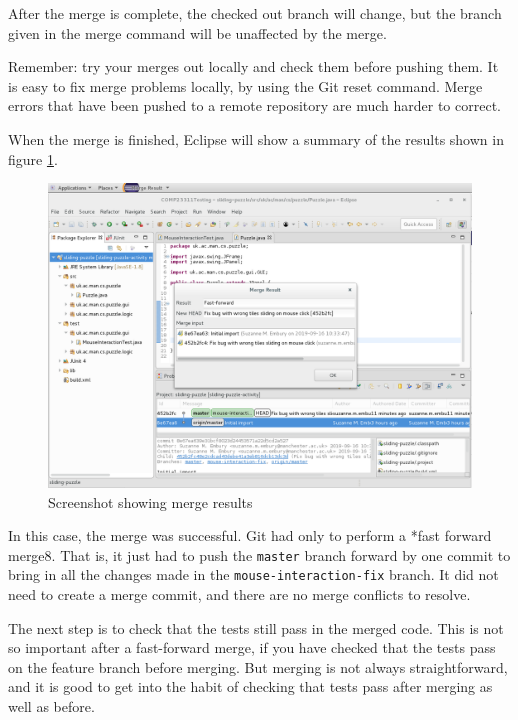 \documentclass[
]{book}
\begin{document}
After the merge is complete, the checked out branch will change, but the branch given in the merge command will be unaffected by the merge.

Remember: try your merges out locally and check them before pushing them. It is easy to fix merge problems locally, by using the Git reset command. Merge errors that have been pushed to a remote repository are much harder to correct.

When the merge is finished, Eclipse will show a summary of the results shown in figure \ref{fig:mergeResultShowingSuccessFastForward-fig}.

\begin{figure}

{\centering \includegraphics[width=1\linewidth]{images/mergeResultShowingSuccessFastForward} 

}

\caption{Screenshot showing merge results}\label{fig:mergeResultShowingSuccessFastForward-fig}
\end{figure}

In this case, the merge was successful. Git had only to perform a *fast forward merge8. That is, it just had to push the \texttt{master} branch forward by one commit to bring in all the changes made in the \texttt{mouse-interaction-fix} branch. It did not need to create a merge commit, and there are no merge conflicts to resolve.

The next step is to check that the tests still pass in the merged code. This is not so important after a fast-forward merge, if you have checked that the tests pass on the feature branch before merging. But merging is not always straightforward, and it is good to get into the habit of checking that tests pass after merging as well as before.
\end{document}
